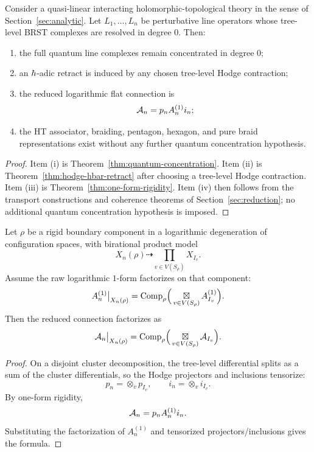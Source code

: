 \begin{theorem}\label{thm:unconditionality}
Consider a quasi-linear interacting holomorphic-topological theory in the sense of Section~\ref{sec:analytic}. Let $L_1,\dots,L_n$ be perturbative line operators whose tree-level BRST complexes are resolved in degree $0$. Then:
\begin{enumerate}[label=\textup{(\roman*)}]
 \item the full quantum line complexes remain concentrated in degree $0$;
 \item an $\hbar$-adic retract is induced by any chosen tree-level Hodge contraction;
 \item the reduced logarithmic flat connection is
 \[
 \mathcal A_n = p_nA_n^{(1)}i_n;
 \]
 \item the HT associator, braiding, pentagon, hexagon, and pure braid representations exist without any further quantum concentration hypothesis.
\end{enumerate}
\end{theorem}

\begin{proof}
Item (i) is Theorem~\ref{thm:quantum-concentration}. Item (ii) is Theorem~\ref{thm:hodge-hbar-retract} after choosing a tree-level Hodge contraction. Item (iii) is Theorem~\ref{thm:one-form-rigidity}. Item (iv) then follows from the transport constructions and coherence theorems of Section~\ref{sec:reduction}; no additional quantum concentration hypothesis is imposed.
\end{proof}

\begin{theorem}\label{thm:reduced-boundary-factorization}
Let $\rho$ be a rigid boundary component in a logarithmic degeneration of configuration spaces, with birational product model
\[
 X_n(\rho) \dashrightarrow \prod_{v\in V(S_\rho)} X_{I_v}.
\]
Assume the raw logarithmic $1$-form factorizes on that component:
\[
 A_n^{(1)}\big|_{X_n(\rho)}
 =
 \mathrm{Comp}_\rho\Big(\mathop{\boxtimes}\displaylimits_{v\in V(S_\rho)} A_{I_v}^{(1)}\Big).
\]
Then the reduced connection factorizes as
\[
 \mathcal A_n\big|_{X_n(\rho)}
 =
 \mathrm{Comp}_\rho\Big(\mathop{\boxtimes}\displaylimits_{v\in V(S_\rho)} \mathcal A_{I_v}\Big).
\]
\end{theorem}

\begin{proof}
On a disjoint cluster decomposition, the tree-level differential splits as a sum of the cluster differentials, so the Hodge projectors and inclusions tensorize:
\[
 p_n=\otimes_v p_{I_v},
 \qquad
 i_n=\otimes_v i_{I_v}.
\]
By one-form rigidity,
\[
 \mathcal A_n=p_nA_n^{(1)}i_n.
\]
Substituting the factorization of $A_n^{(1)}$ and tensorized projectors/inclusions gives the formula.
\end{proof}

